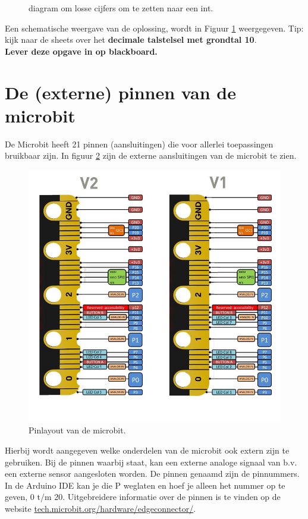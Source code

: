 \begin{enumerate}
\begin{figure}[h!]
	\centering
	\caption{diagram om  losse cijfers om te zetten naar een int. }
	\label{fig:progFig}
\end{figure}
Een schematische weergave van de oplossing, wordt in Figuur \ref{fig:progFig} weergegeven.
\small{Tip: kijk naar de sheets over het \textbf{decimale talstelsel met grondtal 10}}.\\
\textbf{Lever deze opgave in op blackboard.}
\end{enumerate}

\section{De (externe) pinnen van de microbit}
 
De Microbit heeft 21 pinnen (aansluitingen) die voor allerlei toepassingen bruikbaar zijn. In figuur \ref{fig:ardPinB} zijn de externe aansluitingen van de microbit te zien. 
\begin{figure}[h!]
	\captionsetup{justification=centering}
	\includegraphics[width=0.6 \linewidth]{figuren/microbitCon.jpg}
	\centering
	\caption{Pinlayout van de microbit.}
	\label{fig:ardPinB}
\end{figure}
Hierbij wordt aangegeven welke onderdelen van de microbit ook extern zijn te gebruiken. Bij de pinnen waarbij  staat, kan een externe analoge signaal van b.v. een externe sensor aangesloten worden. De pinnen genaamd  zijn de pinnummers. In de Arduino IDE kan je die P weglaten en hoef je alleen het nummer op te geven, 0 t/m 20. Uitgebreidere informatie over de pinnen is te vinden op de website \href{https://tech.microbit.org/hardware/edgeconnector/}{tech.microbit.org/hardware/edgeconnector/}.\\

